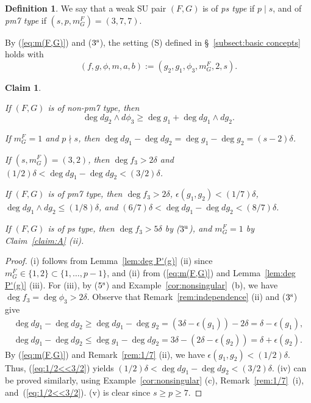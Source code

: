 \documentclass{amsart}
\theoremstyle{plain}
\newtheorem{claim}{Claim}
\theoremstyle{definition}
\newtheorem{definition}[thm]{Definition}
\newcommand{\nd}{\noindent}
\newcommand{\ep}{\epsilon}
\begin{document}
\begin{definition}\rm 
We say that a weak SU pair 
$(F,G)$ is of {\it ps type} if $p\mid s$, 
and of {\it pm7 type} if 
$(s,p,m_G^F)=(3,7,7)$. 
\end{definition}



By (\ref{eq:m(F,G)}) and ($3^{\rm s}$), 
the setting (S) defined in \S ~\ref{subsect:basic concepts} 
holds with 
\begin{equation}\label{eq:(S) for phi3}
(f,g,\phi ,m,a,b):=(g_2,g_1,\phi _3,m^F_G,2,s). 
\end{equation}



\begin{claim}\label{claim:pm7}

\nd{\rm (i)} 
If $(F,G)$ is of non-pm7 type, 
then 
\begin{equation}\label{eq:pfSUreduction1.5}
\deg dg_2\wedge d\phi _3\ge 
\deg g_1+\deg dg_1\wedge dg_2. 
\end{equation}



\nd{\rm (ii)} 
If $m_G^F=1$ and $p\nmid s$, 
then $\deg dg_1-\deg dg_2=\deg g_1-\deg g_2=(s-2)\delta $. 


\nd{\rm (iii)} 
If $(s,m_G^F)=(3,2)$, 
then $\deg f_3>2\delta $ 
and 
$(1/2)\delta <\deg dg_1-\deg dg_2<(3/2)\delta $. 


\nd{\rm (iv)} 
If $(F,G)$ is of pm7 type, 
then $\deg f_3>2\delta $, 
$\ep (g_1,g_2)<(1/7)\delta $, 
$\deg dg_1\wedge dg_2\le (1/8)\delta $, 
and 
$(6/7)\delta <\deg dg_1-\deg dg_2<(8/7)\delta $. 


\nd{\rm (v)} 
If $(F,G)$ is of ps type, 
then 
$\deg f_3>5\delta $ by {\rm ($3^{\rm u}$)}, 
and $m_G^F=1$ by Claim~{\rm \ref{claim:A} (ii)}. 



\end{claim}
\begin{proof}
(i) follows from Lemma~\ref{lem:deg P'(g)} (ii) 
since $m_G^F\in \{ 1,2\} \subset \{ 1,\ldots ,p-1\} $, 
and (ii) from (\ref{eq:m(F,G)}) and Lemma~\ref{lem:deg P'(g)} (iii). 
For (iii), 
by ($5^{\rm s}$) and Example~\ref{cor:nonsingular}~(b), 
we have $\deg f_3=\deg \phi _3>2\delta $. 
Observe that Remark~\ref{rem:independence} (ii) and ($3^{\rm s}$) give 
\begin{equation}\label{eq:1/2<<3/2}
\begin{gathered}
\deg dg_1-\deg dg_2
\ge \deg dg_1-\deg g_2
=(3\delta -\ep (g_1))-2\delta 
=\delta -\ep (g_1), \\
\deg dg_1-\deg dg_2
\le \deg g_1-\deg dg_2
=3\delta -(2\delta -\ep (g_2))
=\delta +\ep (g_2). 
\end{gathered}
\end{equation}
By (\ref{eq:m(F,G)}) and Remark~\ref{rem:1/7} (ii), 
we have $\ep (g_1,g_2)<(1/2)\delta $. 
Thus, (\ref{eq:1/2<<3/2}) yields 
$(1/2)\delta <\deg dg_1-\deg dg_2<(3/2)\delta $. 
(iv) can be proved similarly, 
using Example~\ref{cor:nonsingular} (c), 
Remark~\ref{rem:1/7}~(i), 
and~(\ref{eq:1/2<<3/2}). 
(v) is clear since $s\ge p\ge 7$. 
\end{proof}
\end{document}
